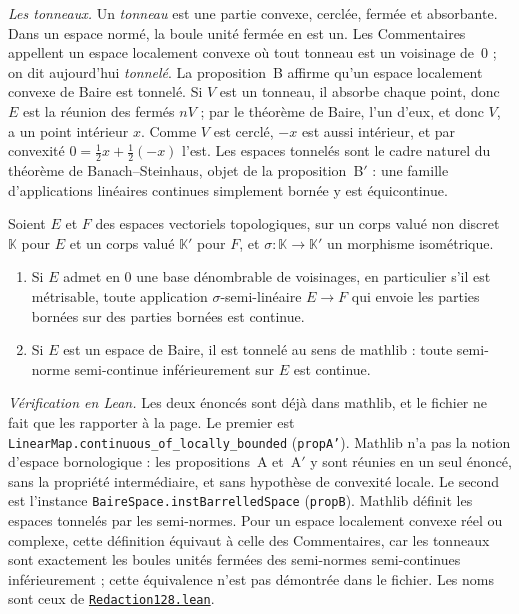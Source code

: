 \emph{Les tonneaux.} Un \emph{tonneau} est une partie convexe, cerclée, fermée et absorbante. Dans un espace normé, la boule unité fermée en est un. Les Commentaires appellent  un espace localement convexe où tout tonneau est un voisinage de~$0$ ; on dit aujourd'hui \emph{tonnelé}. La proposition~B affirme qu'un espace localement convexe de Baire est tonnelé. Si $V$ est un tonneau, il absorbe chaque point, donc $E$ est la réunion des fermés $nV$ ; par le théorème de Baire, l'un d'eux, et donc $V$, a un point intérieur $x$. Comme $V$ est cerclé, $-x$ est aussi intérieur, et par convexité $0 = \tfrac12 x + \tfrac12(-x)$ l'est. Les espaces tonnelés sont le cadre naturel du théorème de Banach--Steinhaus, objet de la proposition~B$'$ : une famille d'applications linéaires continues simplement bornée y est équicontinue.

\begin{encadre}
\begin{enonce}
Soient $E$ et $F$ des espaces vectoriels topologiques, sur un corps valué non discret $\mathbb K$ pour $E$ et un corps valué $\mathbb K'$ pour $F$, et $\sigma : \mathbb K \to \mathbb K'$ un morphisme isométrique.
\begin{enumerate}
\item[a)] Si $E$ admet en $0$ une base dénombrable de voisinages, en particulier s'il est métrisable, toute application $\sigma$-semi-linéaire $E \to F$ qui envoie les parties bornées sur des parties bornées est continue.
\item[b)] Si $E$ est un espace de Baire, il est tonnelé au sens de mathlib : toute semi-norme semi-continue inférieurement sur $E$ est continue.
\end{enumerate}
\end{enonce}
\end{encadre}

\noindent\emph{Vérification en Lean.} Les deux énoncés sont déjà dans mathlib, et le fichier ne fait que les rapporter à la page. Le premier est \texttt{LinearMap.\allowbreak{}continuous\_of\_locally\_bounded} (\texttt{propA'}). Mathlib n'a pas la notion d'espace bornologique : les propositions~A et~A$'$ y sont réunies en un seul énoncé, sans la propriété intermédiaire, et sans hypothèse de convexité locale. Le second est l'instance \texttt{BaireSpace.\allowbreak{}instBarrelledSpace} (\texttt{propB}). Mathlib définit les espaces tonnelés par les semi-normes. Pour un espace localement convexe réel ou complexe, cette définition équivaut à celle des Commentaires, car les tonneaux sont exactement les boules unités fermées des semi-normes semi-continues inférieurement ; cette équivalence n'est pas démontrée dans le fichier. Les noms sont ceux de \href{\leanblobmain/Redaction128.lean}{\texttt{Redaction128.\allowbreak{}lean}}.

